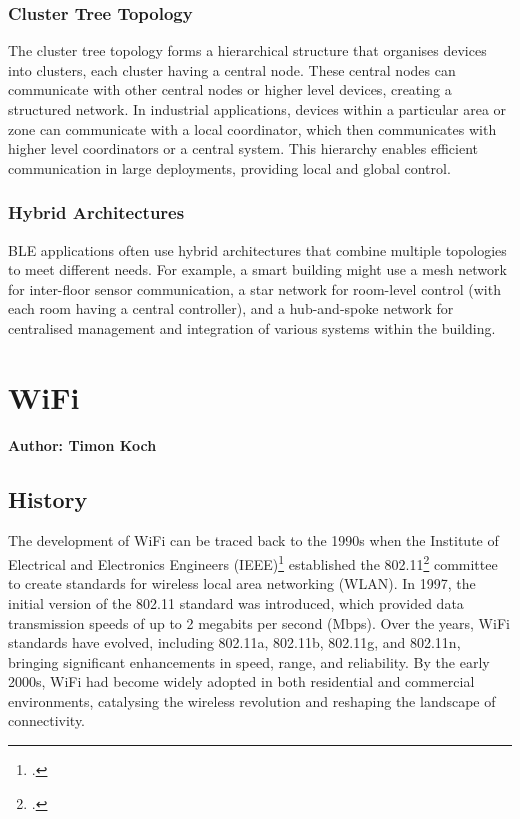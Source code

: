 \subsubsection{Cluster Tree Topology}
The cluster tree topology forms a hierarchical structure that organises devices into clusters, each cluster having a central node. These central nodes can communicate with other central nodes or higher level devices, creating a structured network. In industrial applications, devices within a particular area or zone can communicate with a local coordinator, which then communicates with higher level coordinators or a central system. This hierarchy enables efficient communication in large deployments, providing local and global control.

\subsubsection{Hybrid Architectures}
BLE applications often use hybrid architectures that combine multiple topologies to meet different needs. For example, a smart building might use a mesh network for inter-floor sensor communication, a star network for room-level control (with each room having a central controller), and a hub-and-spoke network for centralised management and integration of various systems within the building.

\section{WiFi}
\textbf{Author: Timon Koch}

\subsection{History}
The development of WiFi can be traced back to the 1990s when the Institute of Electrical and Electronics Engineers (IEEE)\footcite{ieee} established the 802.11\footcite{ieee_802_11} committee to create standards for wireless local area networking (WLAN). In 1997, the initial version of the 802.11 standard was introduced, which provided data transmission speeds of up to 2 megabits per second (Mbps). Over the years, WiFi standards have evolved, including 802.11a, 802.11b, 802.11g, and 802.11n, bringing significant enhancements in speed, range, and reliability. By the early 2000s, WiFi had become widely adopted in both residential and commercial environments, catalysing the wireless revolution and reshaping the landscape of connectivity.

